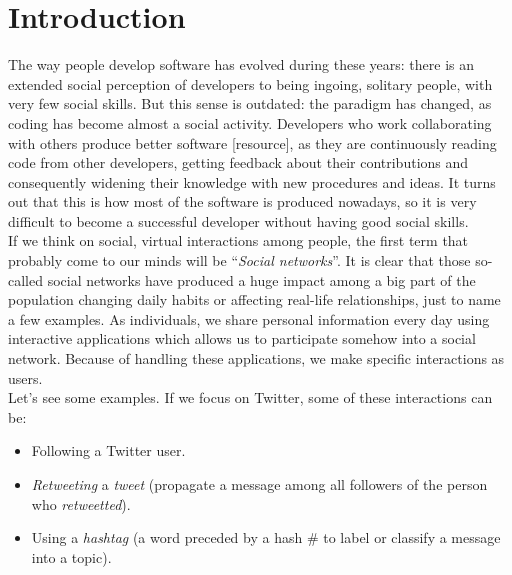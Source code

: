 \documentclass[a4paper, 12pt]{book}
\begin{document}

\cleardoublepage
\chapter{Introduction}
\label{sec:intro} %
The way people develop software has evolved during these years: there is an extended social perception of developers to
being ingoing, solitary people, with very few social skills. But this sense is outdated: the paradigm has changed,
as coding has become almost a social activity. Developers who work collaborating with others produce better software [resource], as they
are continuously reading code from other developers, getting feedback about their contributions and consequently
widening their knowledge with new procedures and ideas. It turns out that this is how most of the software is produced nowadays,
so it is very difficult to become a successful developer without having good social skills.\\
If we think on social, virtual interactions among people, the first term that probably come to our minds will be
``\emph{Social networks}''. It is clear that those so-called social networks have produced a huge impact among a big part of the
population changing daily habits or affecting real-life relationships, just to name a few examples. As individuals, we share personal information every
day using interactive applications which allows us to participate somehow into a social network. Because of handling these
applications, we make specific interactions as users. \\
Let's see some examples. If we focus on Twitter, some of these interactions can be:
\begin{itemize}
    \item Following a Twitter user.
    \item \textit{Retweeting} a \textit{tweet} (propagate a message among all followers of the person who \textit{retweetted}).
    \item Using a \textit{hashtag} (a word preceded by a hash \# to label or classify a message into a topic).
\end{itemize}
\end{document}
